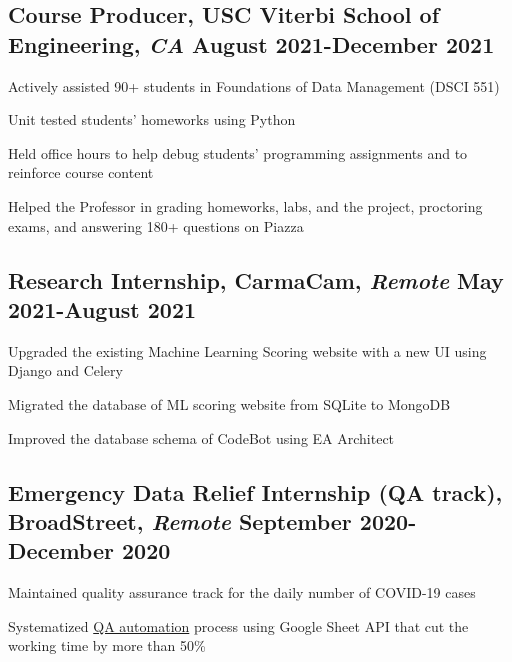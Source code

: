 \documentclass[11pt]{article}
\begin{document}
\subsection*{Course Producer{\normalfont, USC Viterbi School of Engineering,
            \textit{CA} \hfill
            August 2021-December 2021}}
\begin{compactitem}
    \item Actively assisted 90+ students in Foundations of Data Management
    (DSCI 551)
    \item Unit tested students' homeworks using Python
    \item Held office hours to help debug students' programming assignments
    and to reinforce
    course content
    \item Helped the Professor in grading homeworks, labs, and the project,
    proctoring exams, and
    answering 180+ questions on Piazza
\end{compactitem}

\subsection*{Research Internship{\normalfont, CarmaCam, \textit{Remote} \hfill May 2021-August 2021}}
\begin{compactitem}
    \item Upgraded the existing Machine Learning Scoring website with a new UI using Django and Celery
	\item Migrated the database of ML scoring website from SQLite to MongoDB
	\item Improved the database schema of CodeBot using EA Architect
\end{compactitem}

\subsection*{Emergency Data Relief Internship (QA track){\normalfont, BroadStreet, \textit{Remote} \hfill September 2020-December 2020}}
\begin{compactitem}
    \item Maintained quality assurance track for the daily number of COVID-19 cases
    \item Systematized \href{https://github.com/Anthonyive/broadstreet-qa-automation.git}{QA automation}
    process using Google Sheet API that cut the working time by more than
    50\%
\end{compactitem}
\end{document}
